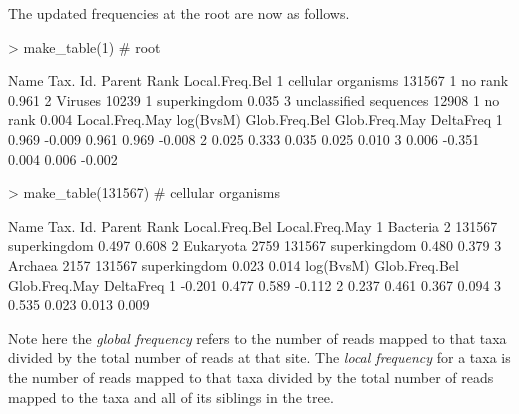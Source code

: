 \documentclass{article}
\begin{document}
The updated frequencies at the root are now as follows. 


\begin{Schunk}
\begin{Sinput}
> make_table(1)        # root
\end{Sinput}
\begin{Soutput}
                    Name Tax. Id. Parent         Rank Local.Freq.Bel
1     cellular organisms   131567      1      no rank          0.961
2                Viruses    10239      1 superkingdom          0.035
3 unclassified sequences    12908      1      no rank          0.004
  Local.Freq.May log(BvsM) Glob.Freq.Bel Glob.Freq.May DeltaFreq
1          0.969    -0.009         0.961         0.969    -0.008
2          0.025     0.333         0.035         0.025     0.010
3          0.006    -0.351         0.004         0.006    -0.002
\end{Soutput}
\begin{Sinput}
> make_table(131567)   # cellular organisms
\end{Sinput}
\begin{Soutput}
       Name Tax. Id. Parent         Rank Local.Freq.Bel Local.Freq.May
1  Bacteria        2 131567 superkingdom          0.497          0.608
2 Eukaryota     2759 131567 superkingdom          0.480          0.379
3   Archaea     2157 131567 superkingdom          0.023          0.014
  log(BvsM) Glob.Freq.Bel Glob.Freq.May DeltaFreq
1    -0.201         0.477         0.589    -0.112
2     0.237         0.461         0.367     0.094
3     0.535         0.023         0.013     0.009
\end{Soutput}
\end{Schunk}
Note here the {\em global  frequency} refers to the number of reads mapped to that taxa divided by the total number of reads at that site.
The {\em local frequency} for a taxa is the number of reads mapped to that taxa divided by the total number of reads mapped to the taxa and all of its siblings in the tree.
\end{document}
